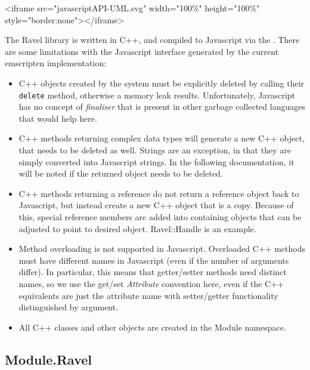 \documentclass{article}
\begin{document}
\begin{rawhtml}
  <iframe src="javascriptAPI-UML.svg" width="100\%" height="100\%" style="border:none"></iframe>
\end{rawhtml}

The Ravel library is written in C++, and compiled to Javascript via
the . There are some
limitations with the Javascript interface generated by the current
emscripten implementation:
\begin{itemize}
\item C++ objects created by the system must be explicitly deleted by
  calling their \verb+delete+ method, otherwise a memory leak
  results. Unfortunately, Javascript has no concept of {\em finaliser}
  that is present in other garbage collected languages that would help
  here.
\item C++ methods returning complex data types will generate a new C++
  object, that needs to be deleted as well. Strings are an exception, in
  that they are simply converted into Javascript strings. In the following
  documentation, it will be noted if the returned object needs to be
  deleted.
\item C++ methods returning a reference do not return a reference
  object back to Javascript, but instead create a new C++ object that is
  a copy. Because of this, special reference members are added into
  containing objects that can be adjusted to point to desired
  object. Ravel::Handle is an example.
\item Method overloading is not supported in Javascript. Overloaded
  C++ methods must have different names in Javascript (even if the
  number of arguments differ). In particular, this means that
  getter/setter methods need distinct names, so we use the get/set{\em
    Attribute} convention here, even if the C++ equivalents are just the
  attribute name with setter/getter functionality distinguished by argument.
\item All C++ classes and other objects are created in the Module namespace.
\end{itemize}

\subsection{Module.Ravel}
\end{document}
